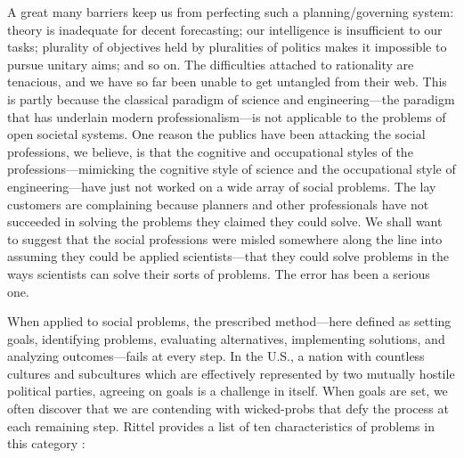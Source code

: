 \begin{displayquote}
A great many barriers keep us from perfecting such a planning/governing system: theory is inadequate for decent
forecasting; our intelligence is insufficient to our tasks; plurality of objectives held by pluralities of politics
makes it impossible to pursue unitary aims; and so on. The difficulties attached to rationality are tenacious, and we
have so far been unable to get untangled from their web. This is partly because the classical paradigm of science and
engineering---the paradigm that has underlain modern professionalism---is not applicable to the problems of open
societal systems. One reason the publics have been attacking the social professions, we believe, is that the cognitive
and occupational styles of the professions---mimicking the cognitive style of science and the occupational style of
engineering---have just not worked on a wide array of social problems. The lay customers are complaining because
planners and other professionals have not succeeded in solving the problems they claimed they could solve. We shall want
to suggest that the social professions were misled somewhere along the line into assuming they could be applied
scientists---that they could solve problems in the ways scientists can solve their sorts of problems. The error has been
a serious one. \cite{rittel_dilemmas_1973}
\end{displayquote}

When applied to social problems, the prescribed method---here defined as setting goals, identifying problems, evaluating
alternatives, implementing solutions, and analyzing outcomes---fails at every step. In the U.S., a nation with countless
cultures and subcultures which are effectively represented by two mutually hostile political parties, agreeing on goals
is a challenge in itself. When goals are set, we often discover that we are contending with \acp{wicked-prob} that defy
the process at each remaining step. Rittel provides a list of ten characteristics of problems in this category
\cite{rittel_dilemmas_1973}:

